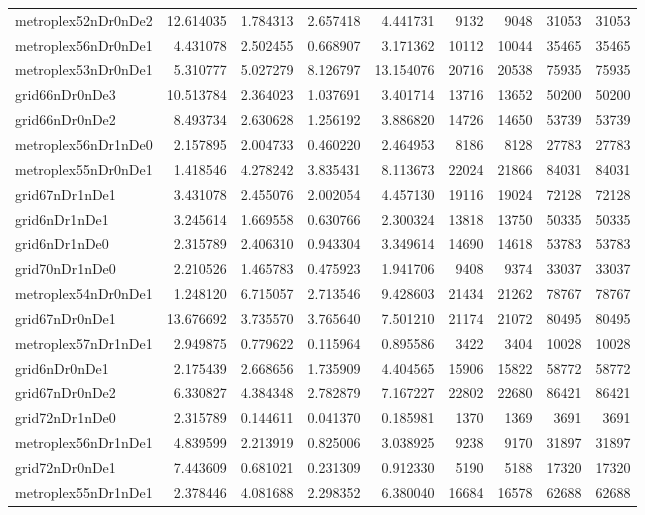 \begin{longtable}{|l|r|r|r|r|r|r|r|r|}
metroplex52nDr0nDe2 & 12.614035 & 1.784313 & 2.657418 & 4.441731 & 9132 & 9048 & 31053 & 31053 \\
metroplex56nDr0nDe1 & 4.431078 & 2.502455 & 0.668907 & 3.171362 & 10112 & 10044 & 35465 & 35465 \\
metroplex53nDr0nDe1 & 5.310777 & 5.027279 & 8.126797 & 13.154076 & 20716 & 20538 & 75935 & 75935 \\
grid66nDr0nDe3 & 10.513784 & 2.364023 & 1.037691 & 3.401714 & 13716 & 13652 & 50200 & 50200 \\
grid66nDr0nDe2 & 8.493734 & 2.630628 & 1.256192 & 3.886820 & 14726 & 14650 & 53739 & 53739 \\
metroplex56nDr1nDe0 & 2.157895 & 2.004733 & 0.460220 & 2.464953 & 8186 & 8128 & 27783 & 27783 \\
metroplex55nDr0nDe1 & 1.418546 & 4.278242 & 3.835431 & 8.113673 & 22024 & 21866 & 84031 & 84031 \\
grid67nDr1nDe1 & 3.431078 & 2.455076 & 2.002054 & 4.457130 & 19116 & 19024 & 72128 & 72128 \\
grid6nDr1nDe1 & 3.245614 & 1.669558 & 0.630766 & 2.300324 & 13818 & 13750 & 50335 & 50335 \\
grid6nDr1nDe0 & 2.315789 & 2.406310 & 0.943304 & 3.349614 & 14690 & 14618 & 53783 & 53783 \\
grid70nDr1nDe0 & 2.210526 & 1.465783 & 0.475923 & 1.941706 & 9408 & 9374 & 33037 & 33037 \\
metroplex54nDr0nDe1 & 1.248120 & 6.715057 & 2.713546 & 9.428603 & 21434 & 21262 & 78767 & 78767 \\
grid67nDr0nDe1 & 13.676692 & 3.735570 & 3.765640 & 7.501210 & 21174 & 21072 & 80495 & 80495 \\
metroplex57nDr1nDe1 & 2.949875 & 0.779622 & 0.115964 & 0.895586 & 3422 & 3404 & 10028 & 10028 \\
grid6nDr0nDe1 & 2.175439 & 2.668656 & 1.735909 & 4.404565 & 15906 & 15822 & 58772 & 58772 \\
grid67nDr0nDe2 & 6.330827 & 4.384348 & 2.782879 & 7.167227 & 22802 & 22680 & 86421 & 86421 \\
grid72nDr1nDe0 & 2.315789 & 0.144611 & 0.041370 & 0.185981 & 1370 & 1369 & 3691 & 3691 \\
metroplex56nDr1nDe1 & 4.839599 & 2.213919 & 0.825006 & 3.038925 & 9238 & 9170 & 31897 & 31897 \\
grid72nDr0nDe1 & 7.443609 & 0.681021 & 0.231309 & 0.912330 & 5190 & 5188 & 17320 & 17320 \\
metroplex55nDr1nDe1 & 2.378446 & 4.081688 & 2.298352 & 6.380040 & 16684 & 16578 & 62688 & 62688 \\

\end{longtable}
